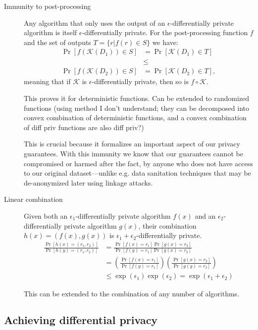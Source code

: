 \documentclass[12pt]{article}
\newcommand{\todo}[1]{{\color{red}#1}}
\newcommand{\fancy}{\mathcal}
\begin{document}
\begin{description}
    \item[Immunity to post-processing] Any algorithm that only uses the output of an $\epsilon$-differentially private algorithm is itself $\epsilon$-differentially private. For the post-processing function $f$ and the set of outputs $T=\{ r | f(r) \in S \}$ we have:
    \begin{align*}
        \Pr[f(\fancy{K}(D_1)) \in S] &= \Pr[\fancy{K}(D_1) \in T] \\
        &\leq \\
        \Pr[f(\fancy{K}(D_2)) \in S] &= \Pr[\fancy{K}(D_2) \in T],
    \end{align*}
    meaning that if $\fancy{K}$ is $\epsilon$-differentially private, then so is $f \circ \fancy{K}$.
    
    This proves it for deterministic functions. Can be extended to randomized functions \todo{(using method I don't understand; they can be decomposed into convex combination of deterministic functions, and a convex combination of diff priv functions are also diff priv?)}
    
    This is crucial because it formalizes an important aspect of our privacy guarantees. With this immunity we know that our guarantees cannot be compromised or harmed after the fact, by anyone who does not have access to our original dataset---unlike e.g. data sanitation techniques that may be de-anonymized later using linkage attacks.
    
    \item[Linear combination] Given both an $\epsilon_1$-differentially private algorithm $f(x)$ and an $\epsilon_2$-differentially private algorithm $g(x)$, their combination $h(x) = (f(x), g(x))$ is $\epsilon_1+\epsilon_2$-differentially private.
    \begin{align*}
        \frac{\Pr[h(x) = (r_1, r_2)]}{\Pr[h(y) = (r_1, r_2)]} &=\frac{ \Pr[f(x)=r_1]\Pr[g(x)=r_2]}{\Pr[f(y)=r_1]\Pr[g(x)=r_2]} \\
        &= \left( \frac{\Pr[f(x)=r_1]}{\Pr[f(y)=r_1]} \right) \left( \frac{\Pr[g(x)=r_2]}{\Pr[g(y)=r_2]} \right) \\
        &\leq \exp(\epsilon_1) \exp(\epsilon_2) = \exp(\epsilon_1 + \epsilon_2)
    \end{align*}
    
    This can be extended to the combination of any number of algorithms.
\end{description}

\subsection{Achieving differential privacy}
\end{document}
